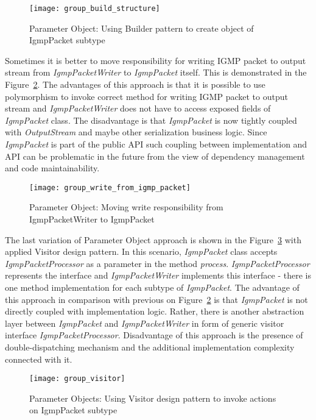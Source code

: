 \begin{figure}[!htb]
    \centering
    \texttt{[image: group\_build\_structure]}
    \caption{Parameter Object: Using Builder pattern to create object of IgmpPacket subtype}
    \label{fig:group_build_structure}
\end{figure}

Sometimes it is better to move responsibility for writing IGMP packet to output stream from \textit{IgmpPacketWriter}
to \textit{IgmpPacket} itself.
This is demonstrated in the Figure~\ref{fig:group_write_from_igmp_packet}.
The advantages of this approach is that it is possible to use polymorphism to invoke correct method for writing
IGMP packet to output stream and \textit{IgmpPacketWriter} does not have to access exposed fields
of \textit{IgmpPacket} class.
The disadvantage is that \textit{IgmpPacket} is now tightly coupled with \textit{OutputStream} and maybe
other serialization business logic.
Since \textit{IgmpPacket} is part of the public API such coupling between implementation and API can be problematic
in the future from the view of dependency management and code maintainability.

\begin{figure}[!htb]
    \centering
    \texttt{[image: group\_write\_from\_igmp\_packet]}
    \caption{Parameter Object: Moving write responsibility from IgmpPacketWriter to IgmpPacket}
    \label{fig:group_write_from_igmp_packet}
\end{figure}

The last variation of Parameter Object approach is shown in the Figure~\ref{fig:group_visitor} with
applied Visitor design pattern.
In this scenario, \textit{IgmpPacket} class accepts \textit{IgmpPacketProcessor} as a parameter
in the method \textit{process}.
\textit{IgmpPacketProcessor} represents the interface and \textit{IgmpPacketWriter} implements this interface
- there is one method implementation for each subtype of \textit{IgmpPacket}.
The advantage of this approach in comparison with previous on Figure~\ref{fig:group_write_from_igmp_packet}
is that \textit{IgmpPacket} is not directly coupled with implementation logic.
Rather, there is another abstraction layer between \textit{IgmpPacket} and \textit{IgmpPacketWriter} in form
of generic visitor interface \textit{IgmpPacketProcessor}.
Disadvantage of this approach is the presence of double-dispatching mechanism and the additional implementation
complexity connected with it.

\begin{figure}[!htb]
    \centering
    \texttt{[image: group\_visitor]}
    \caption{Parameter Objects: Using Visitor design pattern to invoke actions on IgmpPacket subtype}
    \label{fig:group_visitor}
\end{figure}

